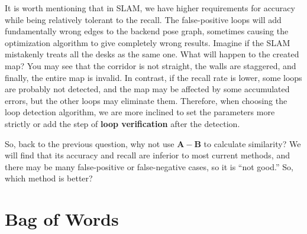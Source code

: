 It is worth mentioning that in SLAM, we have higher requirements for accuracy while being relatively tolerant to the recall. The false-positive loops will add fundamentally wrong edges to the backend pose graph, sometimes causing the optimization algorithm to give completely wrong results. Imagine if the SLAM mistakenly treats all the desks as the same one. What will happen to the created map? You may see that the corridor is not straight, the walls are staggered, and finally, the entire map is invalid. In contrast, if the recall rate is lower, some loops are probably not detected, and the map may be affected by some accumulated errors, but the other loops may eliminate them. Therefore, when choosing the loop detection algorithm, we are more inclined to set the parameters more strictly or add the step of \textbf{loop verification} after the detection.

So, back to the previous question, why not use $\bm{A}-\bm{B}$ to calculate similarity? We will find that its accuracy and recall are inferior to most current methods, and there may be many false-positive or false-negative cases, so it is ``not good.'' So, which method is better?

\section{Bag of Words}


